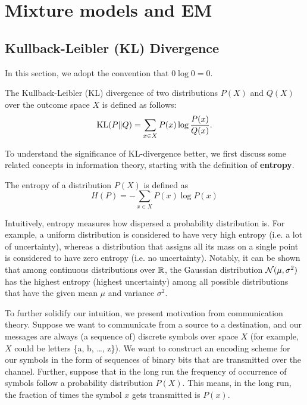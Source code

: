 \documentclass[a4paper]{article}
\begin{document}
\section{Mixture models and EM}

\subsection{Kullback-Leibler (KL) Divergence}
In this section, we adopt the convention that $0 \log 0 = 0$.

\begin{defi}[KL divergence]
  The Kullback-Leibler (KL) divergence of two  
  distributions $P(X)$ and $Q(X)$ 
  over the outcome space $X$ is defined as follows: 
  \[
  \operatorname{KL} (P \Vert Q) = \sum_{x \in X} P(x) \log \frac{P(x)}{Q(x)}.
  \]
\end{defi}

To understand the significance of KL-divergence better, 
we first discuss some related concepts in information theory,
starting with the definition of \textbf{entropy}.
\begin{defi}
  The entropy of a distribution $P(X)$ 
  is defined as 
  \[
  H(P) = - \sum_{x \in X} P(x) \log P(x)
  \]
\end{defi}

Intuitively, entropy measures how dispersed a probability 
distribution is. For example, a uniform distribution is 
considered to have very high entropy (i.e. a lot of uncertainty), 
whereas a distribution that assigns all its mass on a single 
point is considered to have zero entropy (i.e. no uncertainty). 
Notably, it can be shown that among continuous distributions 
over $\mathbb{R}$, the Gaussian distribution $\mathcal{N}(\mu, \sigma^2)$ has 
the highest entropy (highest uncertainty) among all possible 
distributions that have the given mean $\mu$ and variance $\sigma^2$.

To further solidify our intuition, we present motivation from 
communication theory. Suppose we want to communicate from a 
source to a destination, and our messages are always 
(a sequence of) discrete symbols over space $X$ 
(for example, $X$ could be letters \{a, b, \dots, z\}). 
We want to construct an encoding scheme for our symbols 
in the form of sequences of binary bits that are transmitted 
over the channel. Further, suppose that in the long run the 
frequency of occurrence of symbols follow a probability 
distribution $P(X)$. This means, in the long run, the fraction 
of times the symbol $x$ gets transmitted is $P(x)$.
\end{document}
